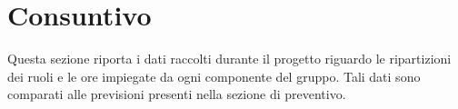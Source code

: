 \section{Consuntivo}
Questa sezione riporta i dati raccolti durante il progetto riguardo le ripartizioni dei ruoli e le ore impiegate da ogni componente del gruppo. Tali dati sono comparati alle previsioni presenti nella sezione di preventivo.